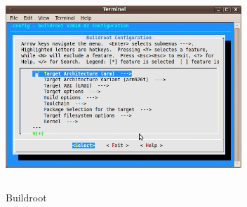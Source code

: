 \begin{enumerate}
	\begin{figure}[ht]
	        \centering
		        \includegraphics[width=3.5in, height=3in]{images/buildroot.png}
			        \caption{Buildroot}
				\end{figure}
\end{enumerate}
